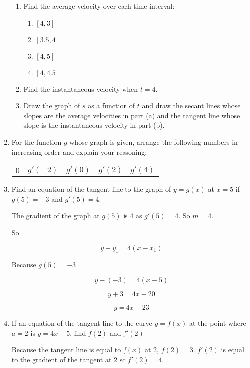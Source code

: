 \documentclass{article}
\begin{document}
\begin{enumerate}
		\begin{enumerate}
			\item Find the average velocity over each time interval:

			\begin{enumerate}
				\item $[4,3]$

				\item $[3.5,4]$

				\item $[4,5]$

				\item $[4,4.5]$
			\end{enumerate}

			\item Find the instantaneous velocity when $t = 4$.

			\item Draw the graph of $s$ as a function of $t$ and draw the secant lines
				whose slopes are the average velocities in part (a) and the tangent
				line whose slope is the instantaneous velocity in part (b).
		\end{enumerate}

		\item For the function $g$ whose graph is given, arrange the following numbers in
			increasing order and explain your reasoning:

			\begin{tabular}{ccccc}
				$0$ & $g'(-2)$ & $g'(0)$ & $g'(2)$ & $g'(4)$
			\end{tabular}

		\item Find an equation of the tangent line to the graph of $y = g(x)$ at $x = 5$ if
			$g(5) = -3$ and $g'(5) = 4$.

			The gradient of the graph at $g(5)$ is $4$ as $g'(5) = 4$. So $m = 4$.

			So

			$$y - y_1 = 4(x - x_1)$$

			Because $g(5) = -3$

			$$y - (-3) = 4(x - 5)$$

			$$y + 3 = 4x - 20$$

			$$y = 4x - 23$$

		\item If an equation of the tangent line to the curve $y = f(x)$ at the point where
			$a=2$ is $y = 4x-5$, find $f(2)$ and $f'(2)$

			Because the tangent line is equal to $f(x)$ at 2, $f(2) = 3$. $f'(2)$ is equal
			to the gradient of the tangent at 2 so $f'(2) = 4$.


\end{enumerate}
\end{document}
